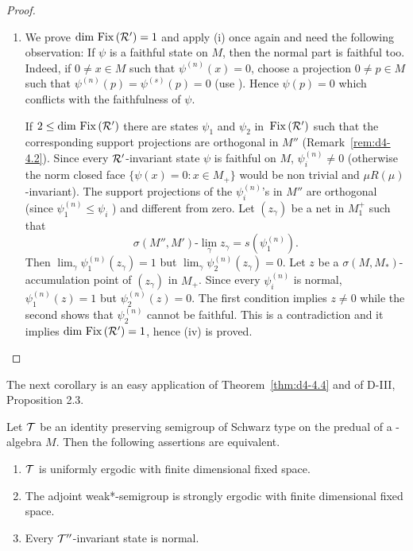 \begin{proof}
\begin{enumerate}[\upshape (i), wide, labelindent=.5em]
\item
We prove $ \dim \mathop{}\mathrm{Fix}\left(\mathcal{R}'\right) = 1 $  and apply (i) once again and need the following observation: If $ \psi $  is a faithful state on $ M $,  then the normal part is faithful too.
Indeed, if $ 0 \neq x \in M $  such that $ \psi^{(n)}(x) = 0 $,  choose a projection $ 0 \neq p \in M $  such that $ \psi^{(n)}(p) = \psi^{(s)}(p) = 0 $ (use \citet[Theorem III.3.8]{takesaki:1979}). 
Hence $ \psi(p) = 0 $  which conflicts with the faithfulness of $ \psi $.

If $ 2 \leq \dim \mathop{}\mathrm{Fix}\left(\mathcal{R}'\right) $  there are states $ \psi_{1} $  and $ \psi_{2} $  in $ \mathop{}\mathrm{Fix}\left(\mathcal{R}'\right) $  such that the corresponding support projections are orthogonal in $ M'' $  (Remark~\ref{rem:d4-4.2}).
Since every $ \mathcal{R}' $-invariant state $ \psi $  is faithful on $ M $, $ \psi_{i}^{(n)} \neq 0 $  (otherwise the norm closed face $ \{\psi(x) = 0: x \in M_{+}\} $  would
be non trivial and $ \mu R(\mu) $-invariant).
The support projections of the $ \psi_{i}^{(n)} $'s in $ M'' $  are orthogonal (since $ \psi_{1}^{(n)} \leq \psi_{i} $ ) and different from zero.
Let $ (z_{\gamma}) $  be a net in $ M_{1}^{+} $  such that
\[
	\sigma(M'',M')\text{-}\lim_{\gamma} z_{\gamma} = s(\psi_{1}^{(n)}).
\]
Then $ \lim_{\gamma} \psi_{1}^{(n)}(z_{\gamma}) = 1 $  but $ \lim_{\gamma} \psi_{2}^{(n)}(z_{\gamma}) = 0 $.
Let $ z $  be a $ \sigma(M,M_{*}) $-accumulation point of $ (z_{\gamma}) $  in $ M_{+} $.
Since every $ \psi_{i}^{(n)} $  is normal, $ \psi_{1}^{(n)}(z) = 1 $  but $ \psi_{2}^{(n)}(z) = 0 $.
The first condition implies $ z \neq 0 $  while the second shows that $ \psi_{2}^{(n)} $  cannot be faithful.
This is a contradiction and it implies $ \dim \mathop{}\mathrm{Fix}\left(\mathcal{R}'\right) = 1 $, hence (iv) is proved.
\end{enumerate}
\end{proof}
The next corollary is an easy application of\/ Theorem~\ref{thm:d4-4.4} and of D-III, Proposition 2.3.
\begin{corollary}\label{cor:d4-4.5}
Let $ \mathcal{T} $  be an identity preserving semigroup of Schwarz type on the predual of a \WA-algebra $ M $.
Then the following assertions are equivalent.
\begin{enumerate}[\upshape (a)]
\item
$ \mathcal{T} $  is uniformly ergodic with finite dimensional fixed space.

\item
The adjoint weak*-semigroup is strongly ergodic with finite dimensional fixed space.

\item
Every $ \mathcal{T}'' $-invariant state is normal.
\end{enumerate}
\end{corollary}
